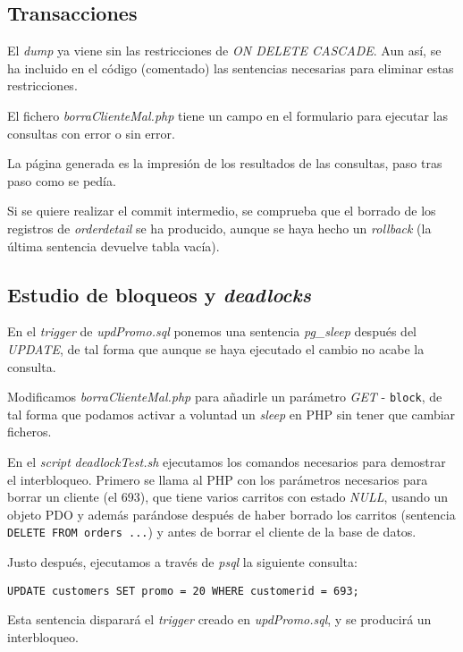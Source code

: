 \documentclass{article}
\begin{document}
\subsection{Transacciones}

El \textit{dump} ya viene sin las restricciones de \textit{ON DELETE CASCADE}. Aun así, se ha incluido en el código (comentado) las sentencias necesarias para eliminar estas restricciones.

El fichero \textit{borraClienteMal.php} tiene un campo en el formulario para ejecutar las consultas con error o sin error.

La página generada es la impresión de los resultados de las consultas, paso tras paso como se pedía.

Si se quiere realizar el commit intermedio, se comprueba que el borrado de los registros de \textit{orderdetail} se ha producido, aunque se haya hecho un \textit{rollback} (la última sentencia devuelve tabla vacía).

\subsection{Estudio de bloqueos y \textit{deadlocks}}

En el \textit{trigger} de \textit{updPromo.sql} ponemos una sentencia \textit{pg\_sleep} después del \textit{UPDATE}, de tal forma que aunque se haya ejecutado el cambio no acabe la consulta.

Modificamos \textit{borraClienteMal.php} para añadirle un parámetro \textit{GET} - \texttt{block}, de tal forma que podamos activar a voluntad un \textit{sleep} en PHP sin tener que cambiar ficheros.

En el \textit{script} \textit{deadlockTest.sh} ejecutamos los comandos necesarios para demostrar el interbloqueo. Primero se llama al PHP con los parámetros necesarios para borrar un cliente (el 693), que tiene varios carritos con estado \textit{NULL}, usando un objeto PDO y además parándose después de haber borrado los carritos (sentencia \texttt{DELETE FROM orders ...}) y antes de borrar el cliente de la base de datos.

Justo después, ejecutamos a través de \textit{psql} la siguiente consulta:

\begin{Verbatim}[frame = lines]
UPDATE customers SET promo = 20 WHERE customerid = 693;
\end{Verbatim}

Esta sentencia disparará el \textit{trigger} creado en \textit{updPromo.sql}, y se producirá un interbloqueo.
\end{document}
